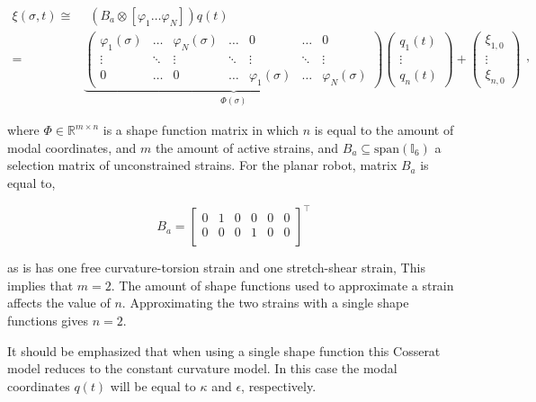 \begin{equation}
\begin{aligned}
    \xi(\sigma,t) \cong & \hspace{5pt}  (B_a \otimes [ \varphi_1 \dots \varphi_N ])q(t)\\ = &  \underbrace{ \begin{pmatrix}
    \varphi_1(\sigma) & \dots  & \varphi_N(\sigma) & \dots     & 0      & \dots  &  0 \\
    \vdots    & \ddots & \vdots    & \ddots    & \vdots & \ddots & \vdots \\
    0         & \dots  & 0         & \dots     & \varphi_1(\sigma) & \dots & \varphi_N (\sigma)
    \end{pmatrix}}_{\Phi(\sigma)} \begin{pmatrix} q_1(t) \\ \vdots \\ q_n(t) \end{pmatrix} +  \begin{pmatrix} \xi_{1,0} \\ \vdots \\ \xi_{n,0}   \end{pmatrix}
    \end{aligned},
\label{eq2:xishape}
\end{equation}

where $\Phi \in \mathbb{R}^{m \times n}$ is a shape function matrix in which $n$ is equal to the amount of modal coordinates, and $m$ the amount of active strains, and $B_a \subseteq \text{span}(\mathbb{I}_6)$ a selection matrix of unconstrained strains. For the planar robot, matrix $B_a$ is equal to,

\begin{equation}
    B_a = \begin{bmatrix}
    0 & 1 & 0 & 0 & 0 & 0 \\
    0 & 0 & 0 & 1 & 0 & 0 \\
    \end{bmatrix}^\top
\end{equation}

as is has one free curvature-torsion strain and one stretch-shear strain, This implies that $m = 2$. The amount of shape functions used to approximate a strain affects the value of $n$. Approximating the two strains with a single shape functions gives $n = 2$. 

It should be emphasized that when using a single shape function this Cosserat model reduces to the constant curvature model. In this case the modal coordinates $q(t)$ will be equal to $\kappa$ and $\epsilon$, respectively. 

